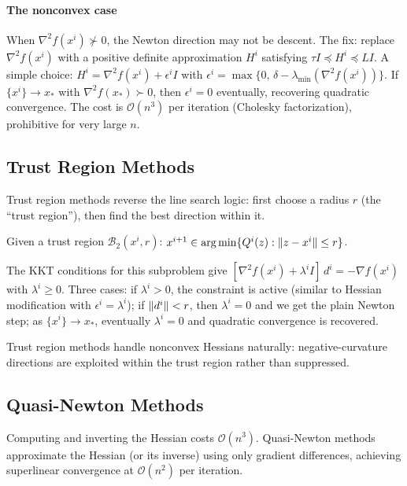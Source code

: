 \paragraph{The nonconvex case}

When $\nabla^2 f(x^i) \not\succ 0$, the Newton direction may not be descent.
The fix: replace $\nabla^2 f(x^i)$ with a positive definite approximation $H^i$ satisfying $\tau I \preceq H^i \preceq LI$.
A simple choice: $H^i = \nabla^2 f(x^i) + \epsilon^i I$ with $\epsilon^i = \max\{0,\, \delta - \lambda_{\min}(\nabla^2 f(x^i))\}$.
If $\{x^i\} \to x_*$ with $\nabla^2 f(x_*) \succ 0$, then $\epsilon^i = 0$ eventually, recovering quadratic convergence.
The cost is $\mathcal{O}(n^3)$ per iteration (Cholesky factorization), prohibitive for very large $n$.


\subsection{Trust Region Methods}\label{sec:trust-region}

Trust region methods reverse the line search logic: first choose a radius $r$ (the ``trust region''), then find the best direction within it.

\begin{definition}\label{def:trust-region}
	Given a trust region $\mathcal{B}_2(x^i, r)$:
	$x^{i+1} \in \operatorname*{arg\,min}\{Q^i(z) : \lVert z - x^i\rVert \leq r\}$.
\end{definition}

The KKT conditions for this subproblem give $[\nabla^2 f(x^i) + \lambda^i I]\, d^i = -\nabla f(x^i)$ with $\lambda^i \geq 0$.
Three cases: if $\lambda^i > 0$, the constraint is active (similar to Hessian modification with $\epsilon^i = \lambda^i$); if $\lVert d^i\rVert < r$, then $\lambda^i = 0$ and we get the plain Newton step; as $\{x^i\} \to x_*$, eventually $\lambda^i = 0$ and quadratic convergence is recovered.

Trust region methods handle nonconvex Hessians naturally: negative-curvature directions are exploited within the trust region rather than suppressed.


\subsection{Quasi-Newton Methods}\label{sec:quasi-newton}

Computing and inverting the Hessian costs $\mathcal{O}(n^3)$.
Quasi-Newton methods approximate the Hessian (or its inverse) using only gradient differences, achieving superlinear convergence at $\mathcal{O}(n^2)$ per iteration.

